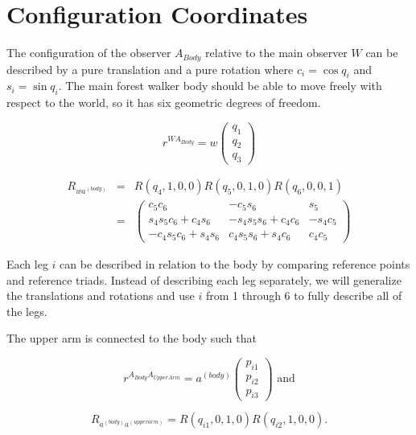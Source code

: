 \documentclass{article}
\begin{document}
\section{Configuration Coordinates} %

The configuration of the observer $A_{Body}$ relative to the main observer $W$ can be described by a pure translation and a pure rotation where $c_i = \cos q_i$ and $s_i = \sin q_i$. The main forest walker body should be able to move freely with respect to the world, so it has six geometric degrees of freedom.

\begin{equation*}
r^{WA_{Body}} = w\left(\begin{array}{c}q_1\\q_2\\q_3\end{array}\right)
\end{equation*}

\begin{eqnarray*}
R_{wa^{(body)}} & = & R(q_4,1,0,0)R(q_5,0,1,0)R(q_6,0,0,1)\\
& = & \left(\begin{array}{ccc}
c_5c_6 & -c_5s_6 & s_5 \\
s_4s_5c_6+c_4s_6 & -s_4s_5s_6+c_4c_6 & -s_4c_5 \\
-c_4s_5c_6+s_4s_6 & c_4s_5s_6+s_4c_6 & c_4c_5
\end{array}\right)
\end{eqnarray*}

Each leg $i$ can be described in relation to the body by comparing reference points and reference triads. Instead of describing each leg separately, we will generalize the translations and rotations and use $i$ from 1 through 6 to fully describe all of the legs.

The upper arm is connected to the body such that

\begin{equation*}
r^{A_{Body}A_{UpperArm}} = a^{(body)}\left(\begin{array}{c}
p_{i1} \\ p_{i2} \\ p_{i3} \end{array}\right)\text{ and}
\end{equation*}

\begin{equation*}
R_{a^{(body)}a^{(upperarm)}} = R(q_{i1},0,1,0)R(q_{i2},1,0,0)\text{.}
\end{equation*}%
\end{document}
